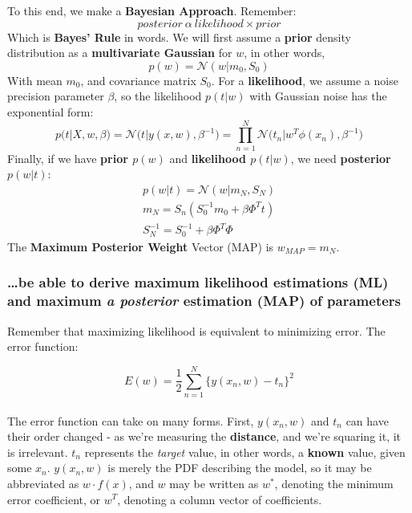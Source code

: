 \documentclass[11pt]{article} %
\begin{document}
To this end, we make a {\bf Bayesian Approach}. Remember:
\begin{equation}
posterior~\alpha~likelihood \times prior
\end{equation}
Which is {\bf Bayes' Rule} in words. We will first assume a  {\bf prior} density distribution as a {\bf multivariate Gaussian} for $w$, in other words,
\begin{equation}
p(w) = \mathcal{N}(w|m_0,S_0)
\end{equation}
With mean $m_0$, and covariance matrix $S_0$. For a {\bf likelihood}, we assume a noise precision parameter $\beta$, so the likelihood $p(t|w)$ with Gaussian noise has the exponential form:
\begin{equation}
p(t|X,w,\beta) = \mathcal{N}\big( t|y(x,w),\beta^{-1} \big) =  \prod_{n=1}^{N} \mathcal{N}\Big( t_n|w^T \phi(x_n), \beta^{-1} \Big)
\end{equation}
Finally, if we have {\bf prior $p(w)$} and {\bf likelihood $p(t|w)$}, we need {\bf posterior $p(w|t)$}:
\begin{gather}
p(w|t) = \mathcal{N}(w|m_N,S_N) \\
m_N = S_n(S_0^{-1}m_0 + \beta \Phi^Tt) \\
S_N^{-1} = S_0^{-1} + \beta \Phi^T \Phi
\end{gather}
The {\bf Maximum Posterior Weight} Vector (MAP) is $w_{MAP} = m_N$.

\subsubsection{\ldots be able to derive maximum likelihood estimations (ML) and maximum {\em a posterior} estimation (MAP) of parameters}

Remember that maximizing likelihood is equivalent to minimizing error. The error function:

\begin{equation}
E(w) = \frac{1}{2} \sum_{n=1}^{N} \big\{ y(x_n,w) - t_n \big\}^2 
\end{equation}
~\\
The error function can take on many forms. First, $y(x_n,w)$ and $t_n$ can have their order changed - as we're measuring the {\bf distance}, and we're squaring it, it is irrelevant. $t_n$ represents the {\em target} value, in other words, a {\bf known} value, given some $x_n$. $y(x_n,w)$ is merely the PDF describing the model, so it may be abbreviated as $w \cdot f(x)$, and $w$ may be written as $w^{\ast}$, denoting the minimum error coefficient, or $w^T$, denoting a column vector of coefficients.\\
\end{document}
